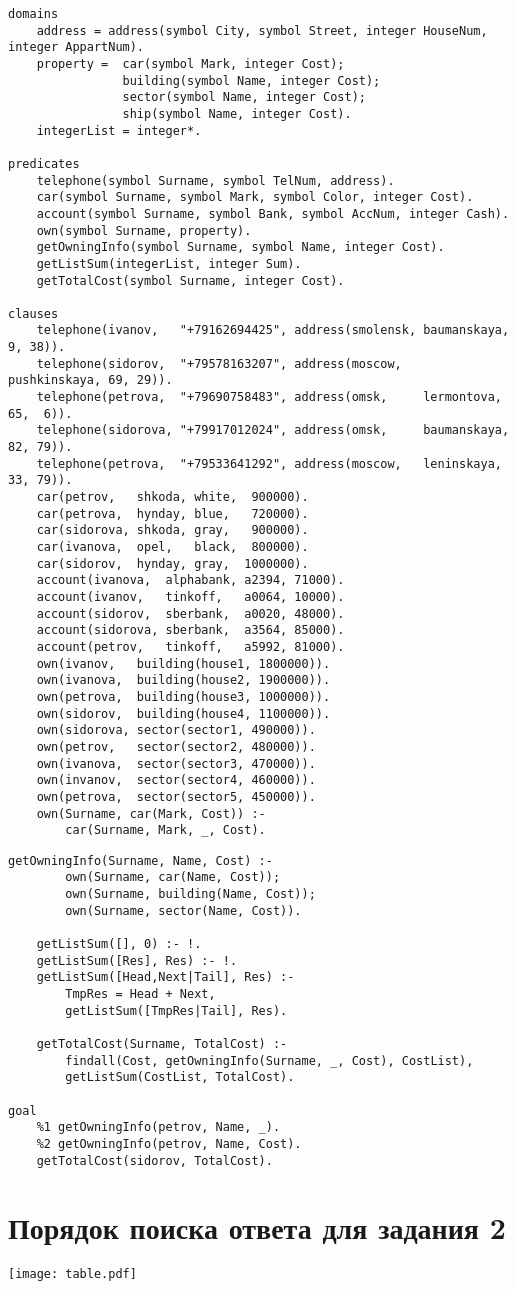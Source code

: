 \begin{lstlisting}
domains
	address = address(symbol City, symbol Street, integer HouseNum, integer AppartNum).
	property = 	car(symbol Mark, integer Cost);
				building(symbol Name, integer Cost);
				sector(symbol Name, integer Cost);
				ship(symbol Name, integer Cost).
	integerList = integer*.

predicates
	telephone(symbol Surname, symbol TelNum, address).
	car(symbol Surname, symbol Mark, symbol Color, integer Cost).
	account(symbol Surname, symbol Bank, symbol AccNum, integer Cash).
	own(symbol Surname, property).
	getOwningInfo(symbol Surname, symbol Name, integer Cost).
	getListSum(integerList, integer Sum).
	getTotalCost(symbol Surname, integer Cost).

clauses
	telephone(ivanov,   "+79162694425", address(smolensk, baumanskaya,   9, 38)).
	telephone(sidorov,  "+79578163207", address(moscow,   pushkinskaya, 69, 29)).
	telephone(petrova,  "+79690758483", address(omsk,     lermontova,   65,  6)).
	telephone(sidorova, "+79917012024", address(omsk,     baumanskaya,  82, 79)).
	telephone(petrova,  "+79533641292", address(moscow,   leninskaya,   33, 79)).
	car(petrov,   shkoda, white,  900000).
	car(petrova,  hynday, blue,   720000).
	car(sidorova, shkoda, gray,   900000).
	car(ivanova,  opel,   black,  800000).
	car(sidorov,  hynday, gray,  1000000).
	account(ivanova,  alphabank, a2394, 71000).
	account(ivanov,   tinkoff,   a0064, 10000).
	account(sidorov,  sberbank,  a0020, 48000).
	account(sidorova, sberbank,  a3564, 85000).
	account(petrov,   tinkoff,   a5992, 81000).
	own(ivanov,   building(house1, 1800000)).
	own(ivanova,  building(house2, 1900000)).
	own(petrova,  building(house3, 1000000)).
	own(sidorov,  building(house4, 1100000)).
	own(sidorova, sector(sector1, 490000)).
	own(petrov,   sector(sector2, 480000)).
	own(ivanova,  sector(sector3, 470000)).
	own(invanov,  sector(sector4, 460000)).
	own(petrova,  sector(sector5, 450000)).
	own(Surname, car(Mark, Cost)) :-
		car(Surname, Mark, _, Cost).
\end{lstlisting}

\clearpage

\begin{lstlisting}[firstnumber=45]
	getOwningInfo(Surname, Name, Cost) :-
		own(Surname, car(Name, Cost));
		own(Surname, building(Name, Cost));
		own(Surname, sector(Name, Cost)).
	
	getListSum([], 0) :- !.
	getListSum([Res], Res) :- !.
	getListSum([Head,Next|Tail], Res) :-
		TmpRes = Head + Next,
		getListSum([TmpRes|Tail], Res).

	getTotalCost(Surname, TotalCost) :-
		findall(Cost, getOwningInfo(Surname, _, Cost), CostList),
		getListSum(CostList, TotalCost).

goal
	%1 getOwningInfo(petrov, Name, _).
	%2 getOwningInfo(petrov, Name, Cost).
	getTotalCost(sidorov, TotalCost).
\end{lstlisting}

\clearpage

{\large\section*{Порядок поиска ответа для задания 2}}

\begin{center}
	\texttt{[image: table.pdf]}
\end{center}
